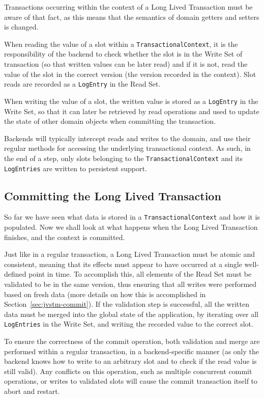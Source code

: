 Transactions occurring within the context of a Long Lived Transaction
must be aware of that fact, as this means that the semantics of domain
getters and setters is changed.

When reading the value of a slot within a
\texttt{TransactionalContext}, it is the responsibility of the backend
to check whether the slot is in the Write Set of transaction (so that
written values can be later read) and if it is not, read the value of
the slot in the correct version (the version recorded in the
context). Slot reads are recorded as a \texttt{LogEntry} in the Read
Set.

When writing the value of a slot, the written value is stored as a
\texttt{LogEntry} in the Write Set, so that it can later be retrieved
by read operations and used to update the state of other domain
objects when committing the transaction.

Backends will typically intercept reads and writes to the domain, and
use their regular methods for accessing the underlying transactional
context. As such, in the end of a step, only slots belonging to the
\texttt{TransactionalContext} and its \texttt{LogEntries} are written
to persistent support.

\subsection{Committing the Long Lived Transaction}

So far we have seen what data is stored in a
\texttt{TransactionalContext} and how it is populated. Now we shall
look at what happens when the Long Lived Transaction finishes, and the
context is committed.

Just like in a regular transaction, a Long Lived Transaction must be
atomic and consistent, meaning that its effects must appear to have
occurred at a single well-defined point in time. To accomplish this,
all elements of the Read Set must be validated to be in the same
version, thus ensuring that all writes were performed based on fresh
data (more details on how this is accomplished in
Section~\ref{sec:jvstm-commit}). If the validation step is successful,
all the written data must be merged into the global state of the
application, by iterating over all \texttt{LogEntries} in the Write
Set, and writing the recorded value to the correct slot.

To ensure the correctness of the commit operation, both validation and
merge are performed within a regular transaction, in a
backend-specific manner (as only the backend knows how to write to an
arbitrary slot and to check if the read value is still valid). Any
conflicts on this operation, such as multiple concurrent commit
operations, or writes to validated slots will cause the commit
transaction itself to abort and restart.

